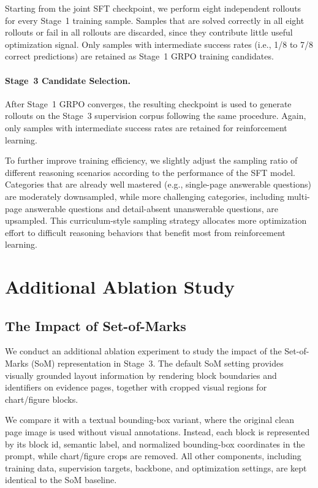 \documentclass[letterpaper]{article} %
\begin{document}
Starting from the joint SFT checkpoint, we perform eight independent rollouts for every Stage~1 training sample. Samples that are solved correctly in all eight rollouts or fail in all rollouts are discarded, since they contribute little useful optimization signal. Only samples with intermediate success rates (i.e., 1/8 to 7/8 correct predictions) are retained as Stage~1 GRPO training candidates.

\paragraph{Stage~3 Candidate Selection.}

After Stage~1 GRPO converges, the resulting checkpoint is used to generate rollouts on the Stage~3 supervision corpus following the same procedure. Again, only samples with intermediate success rates are retained for reinforcement learning.

To further improve training efficiency, we slightly adjust the sampling ratio of different reasoning scenarios according to the performance of the SFT model. Categories that are already well mastered (e.g., single-page answerable questions) are moderately downsampled, while more challenging categories, including multi-page answerable questions and detail-absent unanswerable questions, are upsampled. This curriculum-style sampling strategy allocates more optimization effort to difficult reasoning behaviors that benefit most from reinforcement learning.




\section{Additional Ablation Study}
\subsection{The Impact of Set-of-Marks}

We conduct an additional ablation experiment to study the impact of the Set-of-Marks (SoM) representation in Stage~3. The default SoM setting provides visually grounded layout information by rendering block boundaries and identifiers on evidence pages, together with cropped visual regions for chart/figure blocks.

We compare it with a textual bounding-box variant, where the original clean page image is used without visual annotations. Instead, each block is represented by its block id, semantic label, and normalized bounding-box coordinates in the prompt, while chart/figure crops are removed. All other components, including training data, supervision targets, backbone, and optimization settings, are kept identical to the SoM baseline.
\end{document}
